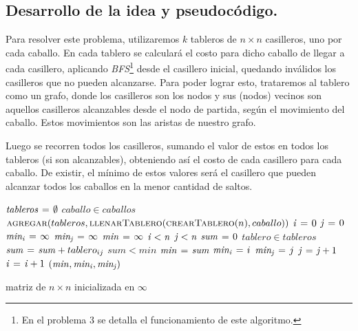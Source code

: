 \newpage
\subsection{Desarrollo de la idea y pseudocódigo.}

\vspace*{0.3cm}

Para resolver este problema, utilizaremos $k$ tableros de $n \times n$
casilleros, uno por cada caballo. En cada tablero se calculará el costo para
dicho caballo de llegar a cada casillero, aplicando 
\textit{BFS}\footnote{En el problema 3 se detalla el funcionamiento de este algoritmo.} 
desde el casillero inicial, quedando inválidos los casilleros que no pueden
alcanzarse. Para poder lograr esto, trataremos al tablero como un grafo, donde 
los casilleros son los nodos y sus (nodos) vecinos son aquellos casilleros 
alcanzables desde el nodo de partida, según el movimiento del caballo. Estos 
movimientos son las aristas de nuestro grafo.

Luego se recorren todos los casilleros, sumando el valor de estos en todos
los tableros (si son alcanzables), obteniendo así el costo de cada casillero
para cada caballo. De existir, el mínimo de estos valores será el casillero
que pueden alcanzar todos los caballos en la menor cantidad de saltos.

\begin{codebox}
\li $\id{tableros} \gets \emptyset$
\li \For $caballo \in caballos$ \Do
\li   $\textnormal{\scshape agregar}(tableros,
                      \textnormal{\scshape llenarTablero}(\textnormal{\scshape crearTablero}(n),
                                           caballo))$
    \End
\li $\id{i} \gets 0$
\li $\id{j} \gets 0$
\li $\id{min_i} \gets \infty$
\li $\id{min_j} \gets \infty$
\li $\id{min} \gets \infty$
\li \While $\id{i} < \id{n}$ \Do
\li   \While $\id{j} < \id{n}$ \Do
\li     $\id{sum} \gets 0$
\li     \For $tablero \in tableros$ \Do
\li         $\id{sum} \gets \id{sum} + tablero_{ij}$
        \End
\li     \If $sum < min$ \Then
\li       $\id{min} \gets \id{sum}$
\li       $\id{min_i} \gets i$
\li       $\id{min_j} \gets j$
        \End
\li   $\id{j} \gets \id{j} + 1$
      \End
\li $\id{i} \gets \id{i} + 1$
    \End
\li \Return $(\id{min}, \id{min_i}, \id{min_j})$
\end{codebox}


\begin{codebox}
\li \Return matriz de $n \times n$ inicializada en $\infty$
\end{codebox}


